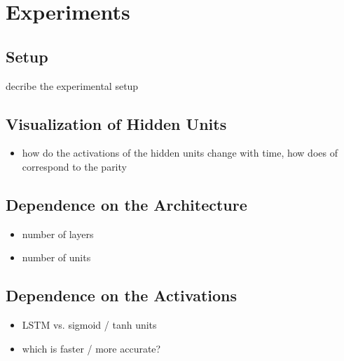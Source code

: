 \documentclass[fleqn,11pt]{article}
\begin{document}
{%
\section{Experiments}
\label{sec:experiments}

\subsection{Setup}
decribe the experimental setup



\subsection{Visualization of Hidden Units}
\begin{itemize}
\item how do the activations of the hidden units change with time, how does of correspond to the parity
\end{itemize}

\subsection{Dependence on the Architecture}
\begin{itemize}
\item number of layers
\item number of units
\end{itemize}

\subsection{Dependence on the Activations}
\begin{itemize}
\item LSTM vs. sigmoid / tanh units
\item which is faster / more accurate?
\end{itemize}


}
\end{document}
